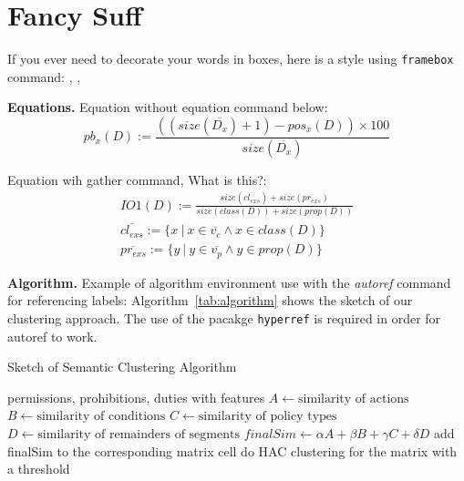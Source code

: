 \documentclass{sig-alternate-05-2015}
\begin{document}


\section{Fancy Suff}\label{fancies}

If you ever need to decorate your words in boxes, here is a style using \texttt{{\color{cyan}framebox}} command: , , 

\textbf{Equations.} Equation without equation command below:
$$ pb_x(D) := \frac{((\mathit{size}(\overline{D_x}) + 1) - \mathit{pos_x}(\mathit{D})) \times 100}{size(\overline{D_x})}$$


Equation wih gather command, What is this?:
\begin{gather*}
\mathit{IO1}(D) := \frac{\mathit{size}(\overline{\mathit{cl_{exs}}}) + \mathit{size}(\overline{\mathit{pr_{exs}}})}{\mathit{size}(\mathit{class}(D)) + \mathit{size}(\mathit{prop}(D))} \\
\overline{\mathit{cl_{exs}}} := \{x~|~x \in \overline{v_c} \wedge x \in \mathit{class}(D) \} \\
\overline{\mathit{pr_{exs}}} := \{y~|~y \in \overline{v_p} \wedge y \in \mathit{prop}(D)\}
\end{gather*}


\textbf{Algorithm.} Example of algorithm environment use with the \textit{autoref} command for referencing labels: 
Algorithm~\autoref{tab:algorithm} shows the sketch of our clustering approach. The use of the pacakge \texttt{hyperref} is required in order for autoref to work.

\begin{algorithm}[tb]
  	\caption{Sketch of Semantic Clustering Algorithm} 
  	\label{tab:algorithm}
  	\small
  	\begin{algorithmic}[1]
  		\Require permissions, prohibitions, duties with features
  		\State $A \gets \text{similarity of actions}$ \Comment{}
  		\State $B \gets \text{similarity of conditions}$ \Comment{}
  		\State $C \gets \text{similarity of policy types}$ \Comment{}
  		\State $D \gets \text{similarity of remainders of segments}$ \Comment{}
 		\State $finalSim \gets \alpha A +  \beta B + \gamma C + \delta D$ \Comment{}
  		\State add finalSim to the corresponding matrix cell \Comment{}
  		\EndFor
  		\State do HAC clustering for the matrix with a threshold
  		\EndFor
  	\end{algorithmic}
  \end{algorithm}
  
\end{document}

